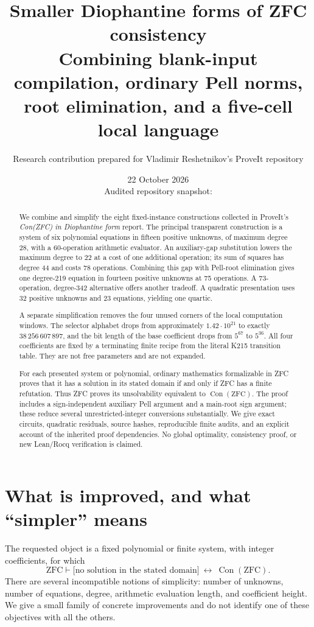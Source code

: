 \documentclass[11pt,a4paper]{article}
\title{\textbf{Smaller Diophantine forms of ZFC consistency}\\[5pt]
 \large Combining blank-input compilation, ordinary Pell norms,\\
 root elimination, and a five-cell local language}
\author{Research contribution prepared for Vladimir Reshetnikov's ProveIt repository}
\date{22 October 2026\\[4pt]\small Audited repository snapshot: \pin}
\theoremstyle{definition}\newtheorem{definition}[theorem]{Definition}
\theoremstyle{remark}\newtheorem{remark}[theorem]{Remark}
\newcommand{\Con}{\operatorname{Con}}
\begin{document}
\maketitle
\begin{abstract}
We combine and simplify the eight fixed-instance constructions collected in
ProveIt's \emph{Con(ZFC) in Diophantine form} report. The principal transparent
construction is a system of six polynomial equations in fifteen positive
unknowns, of maximum degree 28, with a 60-operation arithmetic evaluator.
An auxiliary-gap substitution lowers the maximum degree to 22 at a cost
of one additional operation; its sum of squares has degree 44 and costs
78 operations. Combining this gap with Pell-root elimination gives one
degree-219 equation in fourteen positive unknowns at 75 operations.
A 73-operation, degree-342 alternative offers another tradeoff.
A quadratic presentation uses 32 positive unknowns and 23 equations,
yielding one quartic.

A separate simplification removes the four unused corners of the local
computation windows. The selector alphabet drops from approximately
\(1.42\cdot10^{21}\) to exactly \(38\,256\,607\,897\), and the bit length
of the base coefficient drops from \(5^{67}\) to \(5^{36}\). All four
coefficients are fixed by a terminating finite recipe from the literal
K215 transition table. They are not free parameters and are not expanded.

For each presented system or polynomial, ordinary mathematics formalizable
in ZFC proves that it has a solution in its stated domain if and only if
ZFC has a finite refutation. Thus ZFC proves its unsolvability equivalent
to \(\Con(\mathrm{ZFC})\). The proof includes a sign-independent auxiliary
Pell argument and a main-root sign argument; these reduce several
unrestricted-integer conversions substantially. We give exact circuits,
quadratic residuals, source hashes, reproducible finite audits, and an
explicit account of the inherited proof dependencies. No global
optimality, consistency proof, or new Lean/Rocq verification is claimed.
\end{abstract}
\clearpage
\begingroup\small\setlength{\parskip}{0pt}\tableofcontents\endgroup
\clearpage

\section{What is improved, and what ``simpler'' means}
\label{sec:overview}

The requested object is a fixed polynomial or finite system, with integer
coefficients, for which
\begin{equation}\label{eq:target}
 \mathrm{ZFC}\vdash
 \bigl[\text{no solution in the stated domain}\bigr]
 \ \longleftrightarrow\ \Con(\mathrm{ZFC}).
\end{equation}
There are several incompatible notions of simplicity: number of unknowns,
number of equations, degree, arithmetic evaluation length, and coefficient
height. We give a small family of concrete improvements and do not identify
one of these objectives with all the others.
\end{document}

